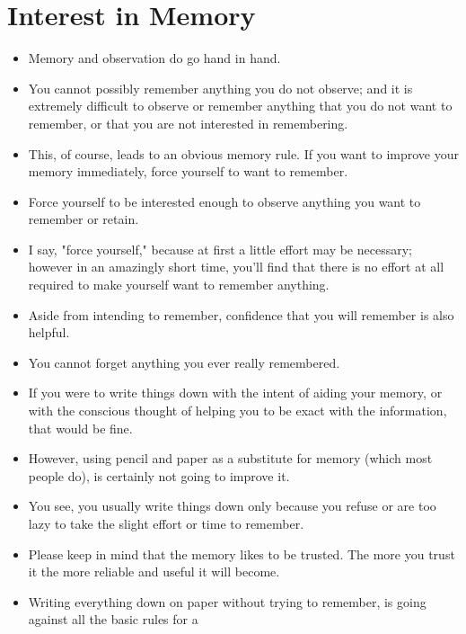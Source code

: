     \section*{Interest in Memory}
        \begin{itemize}
            \item Memory and observation do go hand in
            hand.
            \item You cannot possibly remember anything you do not
            observe; and it is extremely difficult to observe or remember
            anything that you do not want to remember, or that you
            are not interested in remembering.
            \item This, of course, leads to an obvious memory rule. If you
            want to improve your memory immediately, force yourself
            to want to remember.
            \item Force yourself to be interested
            enough to observe anything you want to remember or retain.
            \item I say, "force yourself," because at first a little effort
            may be necessary; however in an amazingly short time,
            you'll find that there is no effort at all required to make
            yourself want to remember anything.
            \item Aside from intending to remember, confidence that you
            will remember is also helpful.
            \item You cannot forget anything you ever really remembered.
            \item If you were to write things down with the intent of aiding
            your memory, or with the conscious thought of helping you
            to be exact with the information, that would be fine.
            \item However, using pencil and paper as a substitute for memory
            (which most people do), is certainly not going to improve
            it.
            \item You see, you usually write
            things down only because you refuse or are too lazy to take
            the slight effort or time to remember.
            \item Please keep in mind that the memory likes to be trusted.
            The more you trust it the more reliable and useful it will
            become.
            \item Writing everything down on paper without trying
            to remember, is going against all the basic rules for a

\end{itemize}
